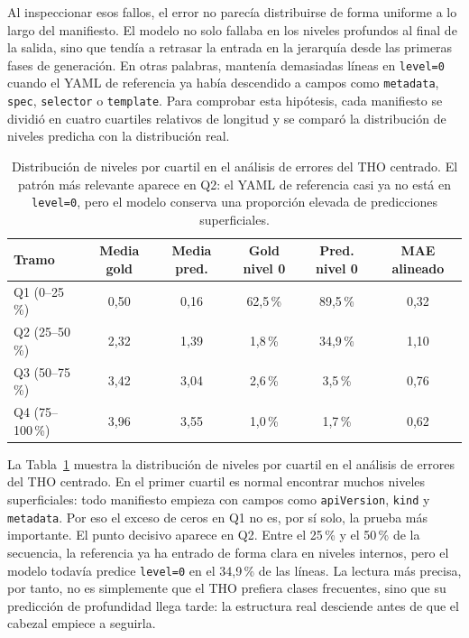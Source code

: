 Al inspeccionar esos fallos, el error no parecía distribuirse de forma uniforme a lo largo del manifiesto. El modelo no solo fallaba en los niveles profundos al final de la salida,
sino que tendía a retrasar la entrada en la jerarquía desde las primeras fases de generación. En otras palabras, mantenía demasiadas líneas en \texttt{level=0} cuando el YAML de
referencia ya había descendido a campos como \texttt{metadata}, \texttt{spec}, \texttt{selector} o \texttt{template}. Para comprobar esta hipótesis, cada
manifiesto se dividió en cuatro cuartiles relativos de longitud y se comparó la distribución de niveles predicha con la distribución real.

\begin{table}[htbp]
\centering
\small
\setlength{\tabcolsep}{4pt}
\caption{Distribución de niveles por cuartil en el análisis de errores del THO centrado.
         El patrón más relevante aparece en Q2: el YAML de referencia casi ya no está en
         \texttt{level=0}, pero el modelo conserva una proporción elevada de predicciones superficiales.}
\label{tab:ch6_quartile_level_drift}
\begin{tabular}{lccccc}
\toprule
\textbf{Tramo} & \textbf{Media gold} & \textbf{Media pred.} & \textbf{Gold nivel 0} & \textbf{Pred. nivel 0} & \textbf{MAE alineado} \\
\midrule
Q1 (0--25\,\%)   & 0,50 & 0,16 & 62,5\,\% & 89,5\,\% & 0,32 \\
Q2 (25--50\,\%)  & 2,32 & 1,39 &  1,8\,\% & 34,9\,\% & 1,10 \\
Q3 (50--75\,\%)  & 3,42 & 3,04 &  2,6\,\% &  3,5\,\% & 0,76 \\
Q4 (75--100\,\%) & 3,96 & 3,55 &  1,0\,\% &  1,7\,\% & 0,62 \\
\bottomrule
\end{tabular}
\end{table}

La Tabla~\ref{tab:ch6_quartile_level_drift} muestra la distribución de niveles por cuartil en el análisis de errores del THO centrado. En el primer cuartil es normal encontrar muchos niveles
superficiales: todo manifiesto empieza con campos como \texttt{apiVersion}, \texttt{kind} y \texttt{metadata}. Por eso el exceso de ceros en Q1 no es, por sí solo, la prueba más importante.
El punto decisivo aparece en Q2. Entre el 25\,\% y el 50\,\% de la secuencia, la referencia ya ha entrado de forma clara en niveles internos, pero el modelo todavía predice \texttt{level=0} en el 34,9\,\% de las
líneas. La lectura más precisa, por tanto, no es simplemente que el THO prefiera clases frecuentes, sino que su predicción de profundidad llega tarde: la estructura real desciende
antes de que el cabezal empiece a seguirla.

